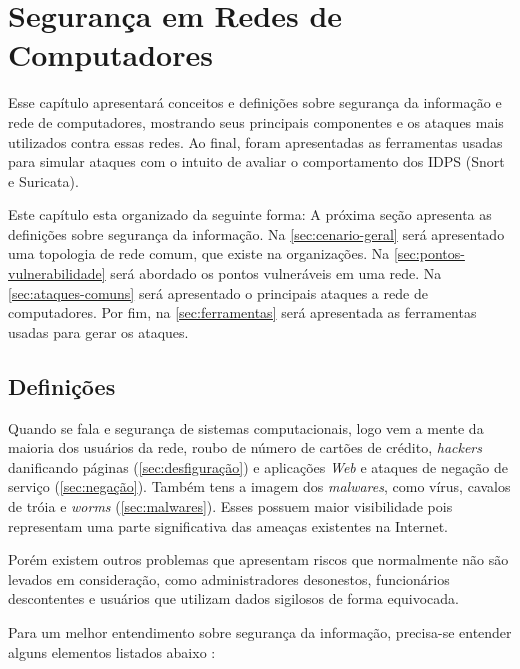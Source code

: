 \chapter{Segurança em Redes de Computadores} \label{ch:segurança}

Esse capítulo apresentará conceitos e definições sobre segurança da informação e rede de computadores, mostrando seus principais componentes e os ataques mais utilizados contra essas redes. Ao final, foram apresentadas as ferramentas usadas para simular ataques com o intuito de avaliar o comportamento dos IDPS (Snort e Suricata).

Este capítulo esta organizado da seguinte forma: A próxima seção apresenta as definições sobre segurança da informação. Na \autoref{sec:cenario-geral} será apresentado uma topologia de rede comum, que existe na organizações. Na \autoref{sec:pontos-vulnerabilidade} será abordado os pontos vulneráveis em uma rede. Na \autoref{sec:ataques-comuns} será apresentado o principais ataques a rede de computadores. Por fim, na \autoref{sec:ferramentas} será apresentada as ferramentas usadas para gerar os ataques.

\section{Definições} \label{sec:definições}

Quando se fala e segurança de sistemas computacionais, logo vem a mente da maioria dos usuários da rede, roubo de número de cartões de crédito, \textit{hackers} danificando páginas (\autoref{sec:desfiguração}) e aplicações \textit{Web} e ataques de negação de serviço (\autoref{sec:negação}). Também tens a imagem dos \textit{malwares}, como vírus, cavalos de tróia e \textit{worms} (\autoref{sec:malwares}). Esses possuem maior visibilidade pois representam uma parte significativa das ameaças existentes na Internet.

Porém existem outros problemas que apresentam riscos que normalmente não são levados em consideração, como administradores desonestos, funcionários descontentes e usuários que utilizam dados sigilosos de forma equivocada.

Para um melhor entendimento sobre segurança da informação, precisa-se entender alguns elementos listados abaixo \cite{esr-gestao}:

